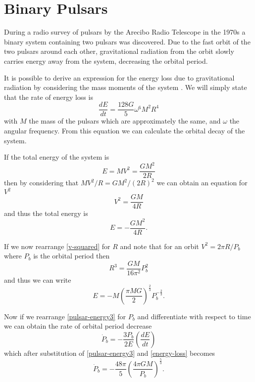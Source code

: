 \section{Binary Pulsars}

During a radio survey of pulsars by the Arecibo Radio Telescope in the 1970s a binary system containing two pulsars was discovered. Due to the fast orbit of the two pulsars around each other, gravitational radiation from the orbit slowly carries energy away from the system, decreasing the orbital period.

It is possible to derive an expression for the energy loss due to gravitational radiation by considering the mass moments of the system \cite{cheng}. We will simply state that the rate of energy loss is
\begin{equation} \label{energy-loss}
	\frac{dE}{dt} = \frac{128 G}{5} \omega^6 M^2 R^4
\end{equation}
with \(M\) the mass of the pulsars which are approximately the same, and \(\omega\) the angular frequency. From this equation we can calculate the orbital decay of the system.

If the total energy of the system is \cite{cheng}
\begin{equation} \label{pulsar-energy}
	E = MV^2 = \frac{G M^2}{2R}
\end{equation}
then by considering that \(MV^2 / R = GM^2 / (2R)^2\) we can obtain an equation for \(V^2\)
\begin{equation} \label{v-squared}
	V^2 = \frac{G M}{4R}
\end{equation}
and thus the total energy is
\begin{equation} \label{pulsar-energy2} 
	E = - \frac{G M^2}{4R} .
\end{equation}

If we now rearrange \eqref{v-squared} for \(R\) and note that for an orbit \(V^2 = 2 \pi R / P_{b}\) where \(P_{b}\) is the orbital period then
\begin{equation} \label{radius-pulsar}
	R^3 = \frac{GM}{16 \pi^2} P^2_b
\end{equation}
and thus we can write
\begin{equation} \label{pulsar-energy3}
	E = - M \left( \frac{\pi M G}{2}\right)^{\frac{2}{3}} P_{b}^{- \frac{2}{3}} .
\end{equation}

Now if we rearrange \eqref{pulsar-energy3} for \(P_b\) and differentiate with respect to time we can obtain the rate of orbital period decrease
\begin{equation} \label{orbit-period-decrease}
	\dot{P}_{b} = - \frac{3 P_b}{2 E} \left(\frac{dE}{dt}\right)
\end{equation}
which after substitution of \eqref{pulsar-energy3} and \eqref{energy-loss} becomes
\begin{equation} \label{orbit-period-decrease2}
	\dot{P}_{b} = - \frac{48 \pi}{5} \left( \frac{4 \pi G M}{P_b}\right)^{\frac{5}{3}} .
\end{equation}


